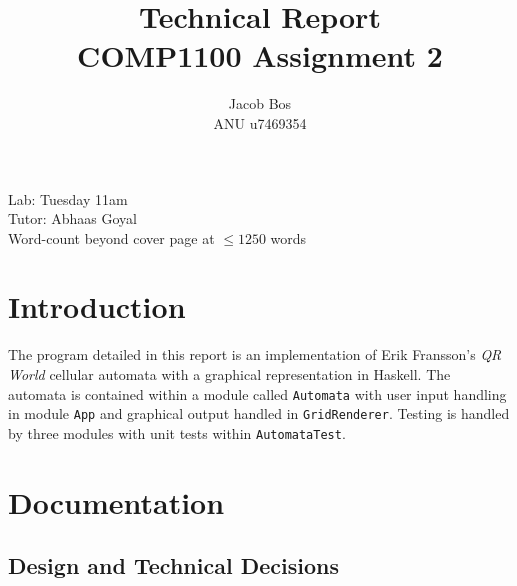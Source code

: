 \documentclass[11pt]{article}
\title{Technical Report\\ COMP1100 Assignment 2}
\author{Jacob Bos\\ ANU u7469354}
\begin{document}
\maketitle
{}
\begin{center}
  Lab: Tuesday 11am\\
  Tutor: Abhaas Goyal\\
  Word-count beyond cover page at $\leq 1250$ words
\end{center}
\tableofcontents
\newpage
{}
\section{Introduction} 
The program detailed in this report is an implementation of Erik Fransson's \textit{QR World} cellular automata with a graphical representation in Haskell. The automata is contained within a module called \verb|Automata| with user input handling in module \verb|App| and graphical output handled in \verb|GridRenderer|. Testing is handled by three modules with unit tests within \verb|AutomataTest|.


\section{Documentation}%
\subsection{Design and Technical Decisions}
\end{document}
